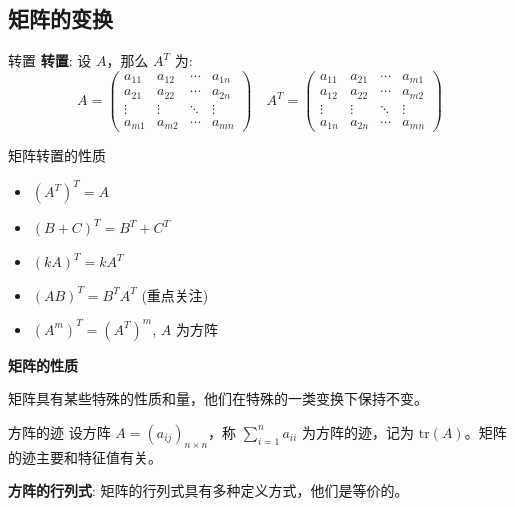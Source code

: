 \documentclass[a4paper,12pt]{ctexart}
\begin{document}
\subsection{矩阵的变换}

\begin{mydef}{转置}{}
    \textbf{转置}: 设 $A$，那么 $A^T$ 为:
    \[
    A=
    \begin{pmatrix}
    a_{11} & a_{12} & \cdots & a_{1n} \\
    a_{21} & a_{22} & \cdots & a_{2n} \\
    \vdots & \vdots & \ddots & \vdots \\
    a_{m1} & a_{m2} & \cdots & a_{mn}
    \end{pmatrix} 
    \quad A^T =
    \begin{pmatrix}
    a_{11} & a_{21} & \cdots & a_{m1} \\
    a_{12} & a_{22} & \cdots & a_{m2} \\
    \vdots & \vdots & \ddots & \vdots \\
    a_{1n} & a_{2n} & \cdots & a_{mn}
    \end{pmatrix}
    \]
\end{mydef}
    
\begin{myprop}{矩阵转置的性质}{}
    \begin{itemize}
        \item $(A^T)^T = A$
        \item $(B+C)^T = B^T + C^T$
        \item $(kA)^T = k A^T$
        \item $(AB)^T = B^TA^T$ (重点关注)
        \item $(A^m)^T = (A^T)^m$, $A$ 为方阵
    \end{itemize}
\end{myprop}

    \textbf{矩阵的性质}
    
    矩阵具有某些特殊的性质和量，他们在特殊的一类变换下保持不变。
    
    \begin{mydef}{方阵的迹}{}
        设方阵 $A = (a_{ij})_{n \times n}$，称 $\sum_{i=1}^{n}a_{ii}$ 为方阵的迹，记为 $\mathrm{tr}(A)$。矩阵的迹主要和特征值有关。
    \end{mydef}

\newpage

    \textbf{方阵的行列式}: 矩阵的行列式具有多种定义方式，他们是等价的。
        
\end{document}
